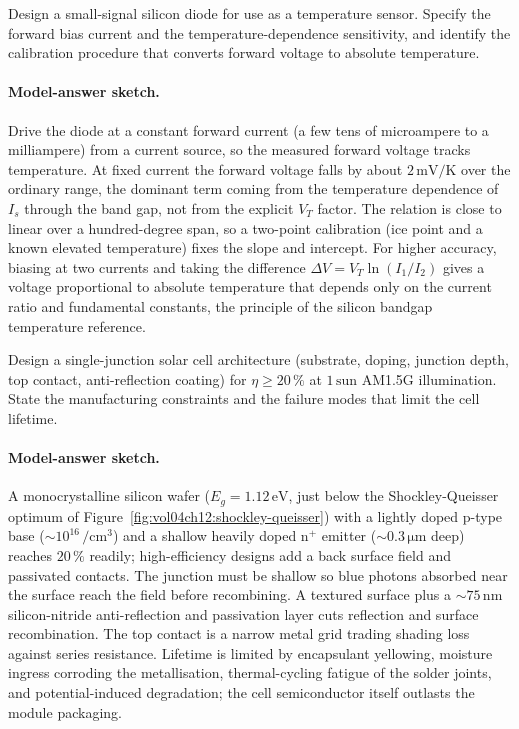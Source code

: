 \begin{exercise}
Design a small-signal silicon diode for use as a temperature sensor.
Specify the forward bias current and the temperature-dependence
sensitivity, and identify the calibration procedure that converts
forward voltage to absolute temperature.
\paragraph{Model-answer sketch.} Drive the diode at a constant forward
current (a few tens of microampere to a milliampere) from a current
source, so the measured forward voltage tracks temperature. At fixed
current the forward voltage falls by about $2\,\si{\milli\volt\per
\kelvin}$ over the ordinary range, the dominant term coming from the
temperature dependence of $I_{s}$ through the band gap, not from the
explicit $V_{T}$ factor. The relation is close to linear over a
hundred-degree span, so a two-point calibration (ice point and a known
elevated temperature) fixes the slope and intercept. For higher
accuracy, biasing at two currents and taking the difference
$\Delta V = V_{T}\ln(I_{1}/I_{2})$ gives a voltage proportional to
absolute temperature that depends only on the current ratio and
fundamental constants, the principle of the silicon bandgap temperature
reference.
\end{exercise}

\begin{exercise}
Design a single-junction solar cell architecture (substrate, doping,
junction depth, top contact, anti-reflection coating) for $\eta \ge
20\,\%$ at $1\,\text{sun}$ AM1.5G illumination. State the
manufacturing constraints and the failure modes that limit the cell
lifetime.
\paragraph{Model-answer sketch.} A monocrystalline silicon wafer
($E_{g} = 1.12\,\si{\electronvolt}$, just below the Shockley-Queisser
optimum of Figure~\ref{fig:vol04ch12:shockley-queisser}) with a
lightly doped p-type base ($\sim 10^{16}\,\si{\per\centi\meter\cubed}$)
and a shallow heavily doped n$^{+}$ emitter ($\sim 0.3\,\si{\micro
\meter}$ deep) reaches $20\,\%$ readily; high-efficiency designs add a
back surface field and passivated contacts. The junction must be shallow
so blue photons absorbed near the surface reach the field before
recombining. A textured surface plus a $\sim 75\,\si{\nano\meter}$
silicon-nitride anti-reflection and passivation layer cuts reflection
and surface recombination. The top contact is a narrow metal grid
trading shading loss against series resistance. Lifetime is limited by
encapsulant yellowing, moisture ingress corroding the metallisation,
thermal-cycling fatigue of the solder joints, and potential-induced
degradation; the cell semiconductor itself outlasts the module
packaging.
\end{exercise}

